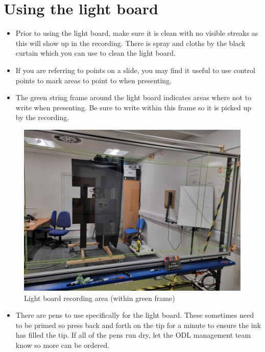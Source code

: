\documentclass[
]{book}
\providecommand{\tightlist}{%
  \setlength{\itemsep}{0pt}\setlength{\parskip}{0pt}}
\begin{document}
\hypertarget{using-the-light-board}{%
\section{Using the light board}\label{using-the-light-board}}

\begin{itemize}
\item
  Prior to using the light board, make sure it is clean with no visible streaks as this will show up in the recording. There is spray and cloths by the black curtain which you can use to clean the light board.
\item
  If you are referring to points on a slide, you may find it useful to use control points to mark areas to point to when presenting.
\item
  The green string frame around the light board indicates areas where not to write when presenting. Be sure to write within this frame so it is picked up by the recording.
\end{itemize}

\begin{figure}

{\centering \includegraphics[width=0.6\linewidth]{Lightboard} 

}

\caption{Light board recording area (within green frame)}\label{fig:lightboard}
\end{figure}

\begin{itemize}
\tightlist
\item
  There are pens to use specifically for the light board. These sometimes need to be primed so press back and forth on the tip for a minute to ensure the ink has filled the tip. If all of the pens run dry, let the ODL management team know so more can be ordered.
\end{itemize}
\end{document}
